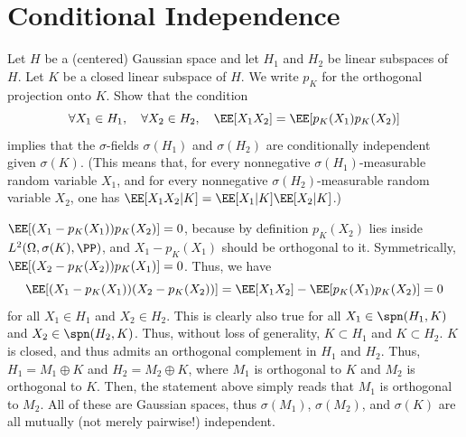 \documentclass{scrartcl}
\begin{document}
\section{Conditional Independence}

\begin{prob*}
    Let $H$ be a (centered) Gaussian space and let $H_1$ and $H_2$ be linear subspaces of $H$. Let $K$ be a closed linear subspace of $H$. We write $p_K$ for the orthogonal projection onto $K$. Show that the condition
    \[\forall X_1 \in H_1, \quad \forall X_2 \in H_2, \quad \EE[X_1X_2] = \EE[p_K(X_1)p_K(X_2)]\]
    implies that the $\sigma$-fields $\sigma(H_1)$ and $\sigma(H_2)$ are conditionally independent given $\sigma(K)$. (This means that, for every nonnegative $\sigma(H_1)$-measurable random variable $X_1$, and for every nonnegative $\sigma(H_2)$-measurable random variable $X_2$, one has $\EE[X_1X_2|K] = \EE[X_1|K]\EE[X_2|K]$.)
\end{prob*}

$\EE[(X_1 - p_K(X_1))p_K(X_2)] = 0$, because by definition $p_K(X_2)$ lies inside $L^2(\Omega,\sigma(K),\PP)$, and $X_1 - p_K(X_1)$ should be orthogonal to it. Symmetrically, $\EE[(X_2 - p_K(X_2))p_K(X_1)] = 0$. Thus, we have
\[
    \EE[(X_1 - p_K(X_1))(X_2 - p_K(X_2))] = \EE[X_1X_2] - \EE[p_K(X_1)p_K(X_2)] = 0
\]
for all $X_1\in H_1$ and $X_2\in H_2$. This is clearly also true for all $X_1 \in \spn(H_1, K)$ and $X_2\in \spn(H_2, K)$. Thus, without loss of generality, $K\subset H_1$ and $K\subset H_2$. $K$ is closed, and thus admits an orthogonal complement in $H_1$ and $H_2$. Thus, $H_1 = M_1\oplus K$ and $H_2 = M_2\oplus K$, where $M_1$ is orthogonal to $K$ and $M_2$ is orthogonal to $K$. Then, the statement above simply reads that $M_1$ is orthogonal to $M_2$. All of these are Gaussian spaces, thus $\sigma(M_1)$, $\sigma(M_2)$, and $\sigma(K)$ are all mutually (not merely pairwise!) independent.

\end{document}
